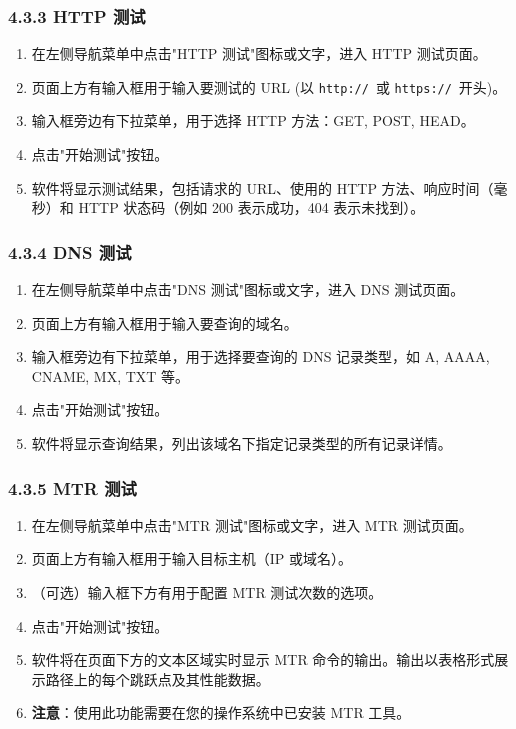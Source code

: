 \documentclass{article}
\begin{document}
\subsubsection*{4.3.3 HTTP 测试}

\begin{enumerate}[label=\arabic*.]
    \item 在左侧导航菜单中点击"HTTP 测试"图标或文字，进入 HTTP 测试页面。
    \item 页面上方有输入框用于输入要测试的 URL (以 \texttt{http://}\ 或 \texttt{https://}\ 开头)。
    \item 输入框旁边有下拉菜单，用于选择 HTTP 方法：GET, POST, HEAD。
    \item 点击"开始测试"按钮。
    \item 软件将显示测试结果，包括请求的 URL、使用的 HTTP 方法、响应时间（毫秒）和 HTTP 状态码（例如 200 表示成功，404 表示未找到）。
\end{enumerate}

\subsubsection*{4.3.4 DNS 测试}

\begin{enumerate}[label=\arabic*.]
    \item 在左侧导航菜单中点击"DNS 测试"图标或文字，进入 DNS 测试页面。
    \item 页面上方有输入框用于输入要查询的域名。
    \item 输入框旁边有下拉菜单，用于选择要查询的 DNS 记录类型，如 A, AAAA, CNAME, MX, TXT 等。
    \item 点击"开始测试"按钮。
    \item 软件将显示查询结果，列出该域名下指定记录类型的所有记录详情。
\end{enumerate}

\subsubsection*{4.3.5 MTR 测试}

\begin{enumerate}[label=\arabic*.]
    \item 在左侧导航菜单中点击"MTR 测试"图标或文字，进入 MTR 测试页面。
    \item 页面上方有输入框用于输入目标主机（IP 或域名）。
    \item （可选）输入框下方有用于配置 MTR 测试次数的选项。
    \item 点击"开始测试"按钮。
    \item 软件将在页面下方的文本区域实时显示 MTR 命令的输出。输出以表格形式展示路径上的每个跳跃点及其性能数据。
    \item \textbf{注意}：使用此功能需要在您的操作系统中已安装 MTR 工具。
\end{enumerate}
\end{document}
